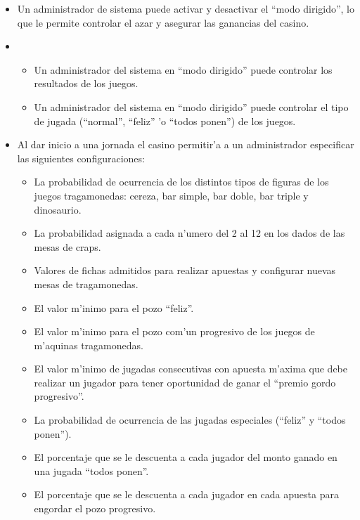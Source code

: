 
\begin{itemize}

\item {} 

    Un administrador de sistema puede activar y desactivar el ``modo dirigido'', lo que le permite controlar el azar y asegurar las ganancias del casino.

\item {}

    \begin{itemize}
        \item Un administrador del sistema en ``modo dirigido'' puede controlar los resultados de los juegos.
        \item Un administrador del sistema en ``modo dirigido'' puede controlar el tipo de jugada (``normal'', ``feliz'' 'o ``todos ponen'') de los juegos.
    \end{itemize}


\item {}

    Al dar inicio a una jornada el casino permitir'a a un administrador especificar las siguientes configuraciones:
    \begin{itemize}
        \item La probabilidad de ocurrencia de los distintos tipos de figuras de los juegos tragamonedas: cereza, bar simple, bar doble, bar triple y dinosaurio.
        \item La probabilidad asignada a cada n'umero del 2 al 12 en los dados de las mesas de craps.
        \item Valores de fichas admitidos para realizar apuestas y configurar nuevas mesas de tragamonedas.
        \item El valor m'inimo para el pozo ``feliz''.
        \item El valor m'inimo para el pozo com'un progresivo de los juegos de m'aquinas tragamonedas.
        \item El valor m'inimo de jugadas consecutivas con apuesta m'axima que debe realizar un jugador para tener oportunidad de ganar el ``premio gordo progresivo''.
        \item La probabilidad de ocurrencia de las jugadas especiales (``feliz'' y ``todos ponen'').
        \item El porcentaje que se le descuenta a cada jugador del monto ganado en una jugada ``todos ponen''.
        \item El porcentaje que se le descuenta a cada jugador en cada apuesta para engordar el pozo progresivo.
    \end{itemize}


\end{itemize}
